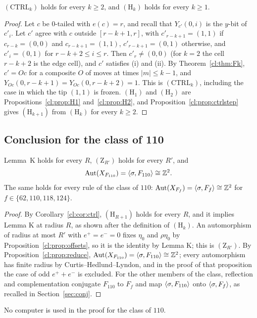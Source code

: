 \begin{corollary}\label{cl:cor:ctrl}
$(\mathrm{CTRL}_k)$ holds for every $k\ge2$, and $(\mathrm H_k)$ holds for every $k\ge1$.
\end{corollary}

\begin{proof}
Let $c$ be $0$-tailed with $e(c)=r$, and recall that $Y_{c'}(0,i)$ is the $y$-bit of $c'_i$. Let $c'$ agree with $c$ outside $[r-k+1,r]$, with $c'_{r-k+1}=(1,1)$ if $c_{r-k}=(0,0)$ and $c_{r-k+1}=(1,1)$, $c'_{r-k+1}=(0,1)$ otherwise, and $c'_i=(0,1)$ for $r-k+2\le i\le r$. Then $c'_r\ne(0,0)$ (for $k=2$ the cell $r-k+2$ is the edge cell), and $c'$ satisfies (i) and (ii). By Theorem~\ref{cl:thm:Fk}, $c'=Oc$ for a composite $O$ of moves at times $|m|\le k-1$, and $Y_{Oc}(0,r-k+1)=Y_{Oc}(0,r-k+2)=1$. This is $(\mathrm{CTRL}_k)$, including the case in which the tip $(1,1)$ is frozen. $(\mathrm H_1)$ and $(\mathrm H_2)$ are Propositions~\ref{cl:prop:H1} and~\ref{cl:prop:H2}, and Proposition~\ref{cl:prop:ctrlstep} gives $(\mathrm H_{k+1})$ from $(\mathrm H_k)$ for every $k\ge2$.
\end{proof}


\subsection{Conclusion for the class of 110}\label{cl:sec:110end}

\begin{theorem}\label{cl:thm:110rigid}
\sloppy Lemma~K holds for every $R$, $(\mathrm Z_{R'})$ holds for every $R'$, and
\[
\operatorname{Aut}(X_{F_{110}})=\langle\sigma,F_{110}\rangle\cong\mathbb{Z}^2.
\]
The same holds for every rule of the class of $110$: $\operatorname{Aut}(X_{F_f})=\langle\sigma,F_f\rangle\cong\mathbb{Z}^2$ for $f\in\{62,110,118,124\}$.
\end{theorem}

\begin{proof}
By Corollary~\ref{cl:cor:ctrl}, $(\mathrm H_{R+1})$ holds for every $R$, and it implies Lemma K at radius $R$, as shown after the definition of $(\mathrm H_k)$. An automorphism of radius at most $R'$ with $e^+=e^-=0$ fixes $\eta_0$ and $\rho\eta_0$ by Proposition~\ref{cl:prop:offsets}, so it is the identity by Lemma K; this is $(\mathrm Z_{R'})$. By Proposition~\ref{cl:prop:reduce}, $\operatorname{Aut}(X_{F_{110}})=\langle\sigma,F_{110}\rangle\cong\mathbb{Z}^2$; every automorphism has finite radius by Curtis--Hedlund--Lyndon, and in the proof of that proposition the case of odd $e^++e^-$ is excluded. For the other members of the class, reflection and complementation conjugate $F_{110}$ to $F_f$ and map $\langle\sigma,F_{110}\rangle$ onto $\langle\sigma,F_f\rangle$, as recalled in Section~\ref{sec:conj}.
\end{proof}

No computer is used in the proof for the class of $110$.
